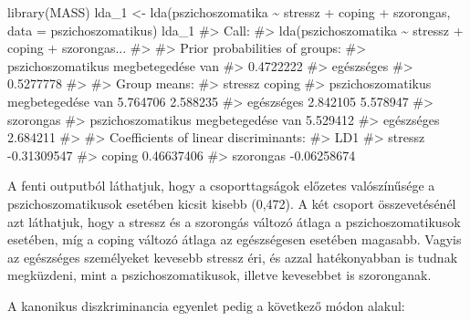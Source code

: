 \documentclass[
  letterpaper,
]{krantz}
\makeatletter
\newenvironment{Shaded}{\begin{snugshade}}{\end{snugshade}}
\newcommand{\AttributeTok}[1]{\textcolor[rgb]{0.40,0.45,0.13}{#1}}
\newcommand{\CommentTok}[1]{\textcolor[rgb]{0.37,0.37,0.37}{#1}}
\newcommand{\FunctionTok}[1]{\textcolor[rgb]{0.28,0.35,0.67}{#1}}
\newcommand{\NormalTok}[1]{\textcolor[rgb]{0.00,0.23,0.31}{#1}}
\newcommand{\OtherTok}[1]{\textcolor[rgb]{0.00,0.23,0.31}{#1}}
\newcommand{\SpecialCharTok}[1]{\textcolor[rgb]{0.37,0.37,0.37}{#1}}
\newenvironment{kframe}{%
\medskip{}
\setlength{\fboxsep}{.8em}
 \def\at@end@of@kframe{}%
 \ifinner\ifhmode%
  \def\at@end@of@kframe{\end{minipage}}%
  \begin{minipage}{\columnwidth}%
 \fi\fi%
 \def\FrameCommand##1{\hskip\@totalleftmargin \hskip-\fboxsep
 \colorbox{shadecolor}{##1}\hskip-\fboxsep
     \hskip-\linewidth \hskip-\@totalleftmargin \hskip\columnwidth}%
 \MakeFramed {\advance\hsize-\width
   \@totalleftmargin\z@ \linewidth\hsize
   \@setminipage}}%
 {\par\unskip\endMakeFramed%
 \at@end@of@kframe}
\renewenvironment{Shaded}{\begin{kframe}}{\end{kframe}}
\makeatother
\begin{document}
\begin{Shaded}
\begin{Highlighting}[]
\FunctionTok{library}\NormalTok{(MASS)}
\NormalTok{lda\_1 }\OtherTok{\textless{}{-}} \FunctionTok{lda}\NormalTok{(pszichoszomatika }\SpecialCharTok{\textasciitilde{}}\NormalTok{ stressz }\SpecialCharTok{+}\NormalTok{ coping }\SpecialCharTok{+}\NormalTok{ szorongas,}
    \AttributeTok{data =}\NormalTok{ pszichoszomatikus)}
\NormalTok{lda\_1}
\CommentTok{\#\textgreater{} Call:}
\CommentTok{\#\textgreater{} lda(pszichoszomatika \textasciitilde{} stressz + coping + szorongas...}
\CommentTok{\#\textgreater{} }
\CommentTok{\#\textgreater{} Prior probabilities of groups:}
\CommentTok{\#\textgreater{} pszichoszomatikus megbetegedése van }
\CommentTok{\#\textgreater{}                           0.4722222 }
\CommentTok{\#\textgreater{}                          egészséges }
\CommentTok{\#\textgreater{}                           0.5277778 }
\CommentTok{\#\textgreater{} }
\CommentTok{\#\textgreater{} Group means:}
\CommentTok{\#\textgreater{}                                      stressz   coping}
\CommentTok{\#\textgreater{} pszichoszomatikus megbetegedése van 5.764706 2.588235}
\CommentTok{\#\textgreater{} egészséges                          2.842105 5.578947}
\CommentTok{\#\textgreater{}                                     szorongas}
\CommentTok{\#\textgreater{} pszichoszomatikus megbetegedése van  5.529412}
\CommentTok{\#\textgreater{} egészséges                           2.684211}
\CommentTok{\#\textgreater{} }
\CommentTok{\#\textgreater{} Coefficients of linear discriminants:}
\CommentTok{\#\textgreater{}                   LD1}
\CommentTok{\#\textgreater{} stressz   {-}0.31309547}
\CommentTok{\#\textgreater{} coping     0.46637406}
\CommentTok{\#\textgreater{} szorongas {-}0.06258674}
\end{Highlighting}
\end{Shaded}

A fenti outputból láthatjuk, hogy a csoporttagságok előzetes
valószínűsége a pszichoszomatikusok esetében kicsit kisebb (0,472). A
két csoport összevetésénél azt láthatjuk, hogy a stressz és a szorongás
változó átlaga a pszichoszomatikusok esetében, míg a coping változó
átlaga az egészségesen esetében magasabb. Vagyis az egészséges
személyeket kevesebb stressz éri, és azzal hatékonyabban is tudnak
megküzdeni, mint a pszichoszomatikusok, illetve kevesebbet is
szoronganak.

A kanonikus diszkriminancia egyenlet pedig a következő módon alakul:
\end{document}
